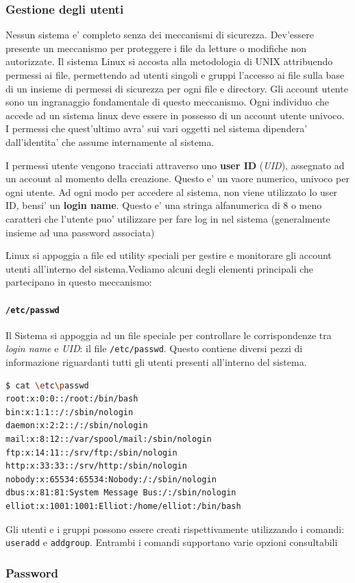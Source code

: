 \subsubsection{Gestione degli utenti}
Nessun sistema e' completo senza dei meccanismi di sicurezza. Dev'essere presente un meccanismo per proteggere i file da letture o modifiche non autorizzate. Il sistema Linux si accosta  alla metodologia di UNIX attribuendo permessi ai file, permettendo ad utenti singoli e gruppi l'accesso ai file sulla base di un insieme di permessi di sicurezza per ogni file e directory. Gli account utente sono un ingranaggio fondamentale di questo meccanismo. Ogni individuo che accede ad un sistema linux deve essere in possesso di un account utente univoco. I permessi che quest'ultimo avra' sui vari oggetti nel sistema dipendera' dall'identita' che assume internamente al sistema.

I permessi utente vengono tracciati attraverso uno \textbf{user ID} (\emph{UID}), assegnato ad un account al momento della creazione. Questo e' un vaore numerico, univoco per ogni utente. Ad ogni modo per accedere al sistema, non viene utilizzato lo user ID, bensi' un \textbf{login name}. Questo e' una stringa alfanumerica di 8 o meno caratteri che l'utente puo' utilizzare per fare log in nel sistema (generalmente insieme ad una password associata)

Linux si appoggia a file ed utility speciali per gestire e monitorare gli account utenti all'interno del sistema.Vediamo alcuni degli elementi principali che partecipano in questo meccanismo:

\paragraph{\texttt{/etc/passwd}} Il Sistema si appoggia ad un file speciale per controllare le corrispondenze tra \emph{login name} e \emph{UID}: il file \texttt{/etc/passwd}. Questo contiene diversi pezzi di informazione riguardanti tutti gli utenti presenti all'interno del sistema.

\begin{lstlisting}[language=bash,basicstyle=\ttfamily,frame=single,caption={Struttura di un file /etc/passwd},captionpos=b]
$ cat \etc\passwd
root:x:0:0::/root:/bin/bash
bin:x:1:1::/:/sbin/nologin
daemon:x:2:2::/:/sbin/nologin
mail:x:8:12::/var/spool/mail:/sbin/nologin
ftp:x:14:11::/srv/ftp:/sbin/nologin
http:x:33:33::/srv/http:/sbin/nologin
nobody:x:65534:65534:Nobody:/:/sbin/nologin
dbus:x:81:81:System Message Bus:/:/sbin/nologin
elliot:x:1001:1001:Elliot:/home/elliot:/bin/bash
\end{lstlisting}

Gli utenti e i gruppi possono essere creati rispettivamente utilizzando i comandi: \texttt{useradd} e \texttt{addgroup}. Entrambi i comandi supportano varie opzioni consultabili 

\subsubsection{Password}

